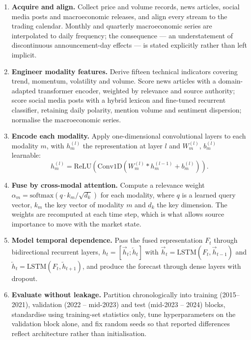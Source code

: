 \begin{enumerate}[label=\textbf{Step \arabic*.},leftmargin=4.2em]
\item \textbf{Acquire and align.} Collect price and volume records, news articles, social
media posts and macroeconomic releases, and align every stream to the trading calendar.
Monthly and quarterly macroeconomic series are interpolated to daily frequency; the
consequence --- an understatement of discontinuous announcement-day effects --- is stated
explicitly rather than left implicit.

\item \textbf{Engineer modality features.} Derive fifteen technical indicators covering
trend, momentum, volatility and volume. Score news articles with a domain-adapted
transformer encoder, weighted by relevance and source authority; score social media posts
with a hybrid lexicon and fine-tuned recurrent classifier, retaining daily polarity,
mention volume and sentiment dispersion; normalise the macroeconomic series.

\item \textbf{Encode each modality.} Apply one-dimensional convolutional layers to each
modality $m$, with $h_m^{(l)}$ the representation at layer $l$ and $W_m^{(l)}$,
$b_m^{(l)}$ learnable:
\begin{equation}
h_m^{(l)} = \mathrm{ReLU}\!\left(\mathrm{Conv1D}\!\left(W_m^{(l)} * h_m^{(l-1)} +
b_m^{(l)}\right)\right).
\end{equation}

\item \textbf{Fuse by cross-modal attention.} Compute a relevance weight $\alpha_m =
\mathrm{softmax}(q \cdot k_m / \sqrt{d_k})$ for each modality, where $q$ is a learned
query vector, $k_m$ the key vector of modality $m$ and $d_k$ the key dimension. The
weights are recomputed at each time step, which is what allows source importance to move
with the market state.

\item \textbf{Model temporal dependence.} Pass the fused representation $F_t$ through
bidirectional recurrent layers, $h_t = [\overrightarrow{h}_t ; \overleftarrow{h}_t]$ with
$\overrightarrow{h}_t = \mathrm{LSTM}(F_t, \overrightarrow{h}_{t-1})$ and
$\overleftarrow{h}_t = \mathrm{LSTM}(F_t, \overleftarrow{h}_{t+1})$, and produce the
forecast through dense layers with dropout.

\item \textbf{Evaluate without leakage.} Partition chronologically into training
(2015--2021), validation (2022 -- mid-2023) and test (mid-2023 -- 2024) blocks, standardise
using training-set statistics only, tune hyperparameters on the validation block alone,
and fix random seeds so that reported differences reflect architecture rather than
initialisation.
\end{enumerate}

